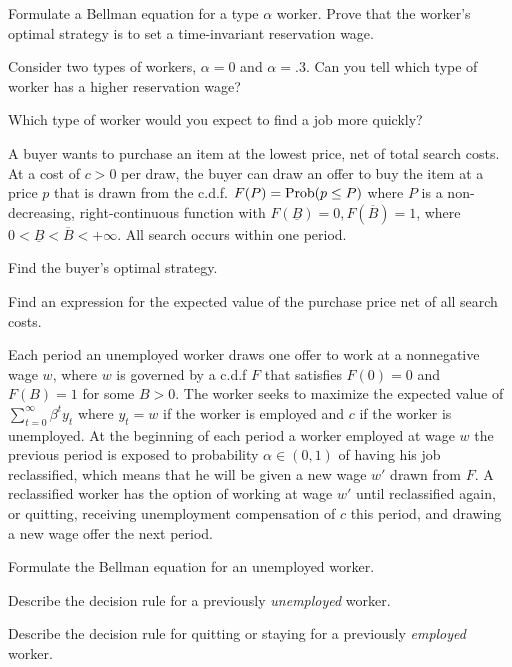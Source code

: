  \medskip
   Formulate a Bellman equation for a type $\alpha$ worker.  Prove that the worker's optimal
 strategy is to set a time-invariant reservation wage.

 \medskip
   Consider two types of workers, $\alpha = 0$ and $\alpha = .3$.  Can you tell which type of worker has a higher
 reservation wage?

 \medskip
   Which type of worker would you expect to find a job more quickly?


\medskip
{} 
\medskip
\noindent
A buyer wants to purchase an item at the  lowest price, net of total search costs. At a cost of $c>0$ per draw, the buyer can
draw an offer to buy the item at a price $p$ that is drawn from the c.d.f. $F(P) = {\rm Prob}(p \leq P)$ where $P$ is a non-decreasing,
right-continuous function with $F(\underline B)=0, F(\overline B) =1$, where $0 < \underline B < \overline B < +\infty$.  All search occurs within one period.

\medskip
{}  Find the buyer's optimal strategy.

\medskip
{} Find an expression for the expected value of the purchase price net of all
search costs.


\medskip
{} 
\medskip
\noindent Each period an unemployed worker draws one offer to work at a nonnegative wage $w$, where $w$ is governed by
a c.d.f $F$ that satisfies $F(0)= 0$ and $F(B) = 1$ for some $B >0$. The worker seeks to maximize the expected value
of $\sum_{t=0}^\infty \beta^t y_t$ where $y_t =w$ if the worker is employed and $c$ if the worker is unemployed.
At the beginning of each period a worker employed at wage $w$ the previous period is exposed to  probability 
$\alpha \in (0,1)$ of having his job reclassified, which means that he will be given a new wage $w'$ drawn from $F$.  A reclassified worker has the
option of working at wage $w'$ until reclassified again, or quitting, receiving unemployment compensation of $c$ this period, and drawing
a new wage offer the next period.

\medskip
{}  Formulate the Bellman equation for an unemployed worker.

\medskip
{} Describe the decision rule for a previously {\it unemployed\/} worker.

\medskip
{} Describe the decision rule for quitting or staying for a previously {\it employed\/} worker.

